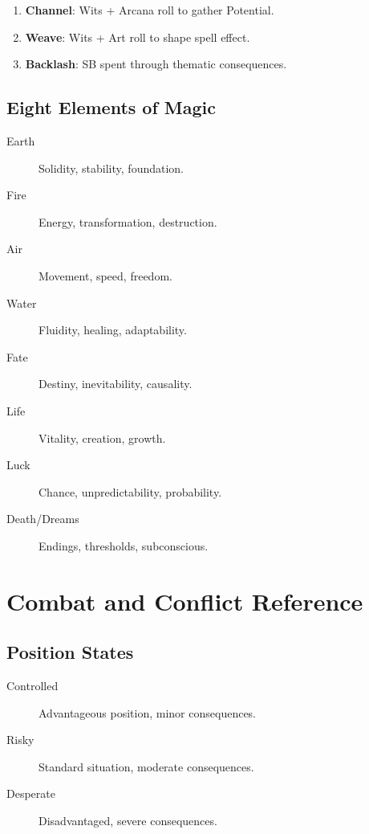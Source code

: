 \begin{enumerate}
\item \textbf{Channel}: Wits + Arcana roll to gather Potential.
\item \textbf{Weave}: Wits + Art roll to shape spell effect.
\item \textbf{Backlash}: SB spent through thematic consequences.
\end{enumerate}

\subsection{Eight Elements of Magic}
\label{subsec:elements-ref}

\begin{description}
\item[Earth] Solidity, stability, foundation.
\item[Fire] Energy, transformation, destruction.
\item[Air] Movement, speed, freedom.
\item[Water] Fluidity, healing, adaptability.
\item[Fate] Destiny, inevitability, causality.
\item[Life] Vitality, creation, growth.
\item[Luck] Chance, unpredictability, probability.
\item[Death/Dreams] Endings, thresholds, subconscious.
\end{description}

\section{Combat and Conflict Reference}
\label{sec:combat-reference}

\subsection{Position States}
\label{subsec:position-ref}

\begin{description}
\item[Controlled] Advantageous position, minor consequences.
\item[Risky] Standard situation, moderate consequences.
\item[Desperate] Disadvantaged, severe consequences.
\end{description}


